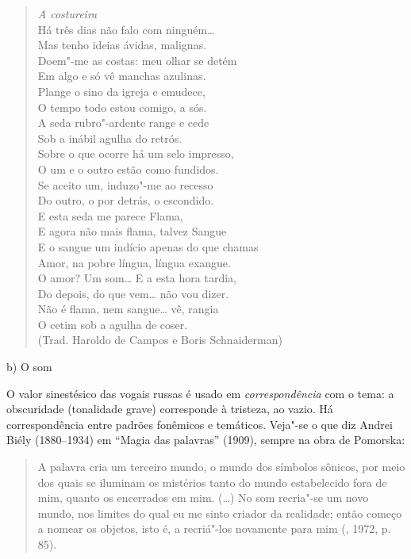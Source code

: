 \begin{verse}
\emph{A costureira}\\[8pt]
Há três dias não falo com ninguém\ldots{}\\
Mas tenho ideias ávidas, malignas.\\
Doem"-me as costas: meu olhar se detém\\
Em algo e só vê manchas azulinas.\\[8pt]
Plange o sino da igreja e emudece,\\
O tempo todo estou comigo, a sós.\\
A seda rubro"-ardente range e cede\\
Sob a inábil agulha do retrós.\\[8pt]
Sobre o que ocorre há um selo impresso,\\
O um e o outro estão como fundidos.\\
Se aceito um, induzo"-me ao recesso\\
Do outro, o por detrás, o escondido.\\[8pt]
E esta seda me parece Flama,\\
E agora não mais flama, talvez Sangue\\
E o sangue um indício apenas do que chamas\\
Amor, na pobre língua, língua exangue.\\[8pt]
O amor? Um som\ldots{} E a esta hora tardia,\\
Do depois, do que vem\ldots{} não vou dizer.\\
Não é flama, nem sangue\ldots{} vê, rangia\\
O cetim sob a agulha de coser.\\[8pt]
(Trad. Haroldo de Campos e Boris Schnaiderman)
\end{verse}

\begin{flushleft}
b) O som
\end{flushleft}

O valor sinestésico das vogais russas é usado em \emph{correspondência}
com o tema: a obscuridade (tonalidade grave) corresponde à tristeza, ao
vazio. Há correspondência entre padrões fonêmicos e temáticos. Veja"-se o
que diz Andrei Biély (1880--1934) em ``Magia das palavras'' (1909),
sempre na obra de Pomorska:

\begin{quote}
A palavra cria um terceiro mundo, o mundo dos símbolos sônicos, por meio
dos quais se iluminam os mistérios tanto do mundo estabelecido fora de
mim, quanto os encerrados em mim. (\ldots{}) No som recria"-se um novo mundo,
nos limites do qual eu me sinto criador da realidade; então começo a
nomear os objetos, isto é, a recriá"-los novamente para mim
(, 1972, p. 85).
\end{quote}

